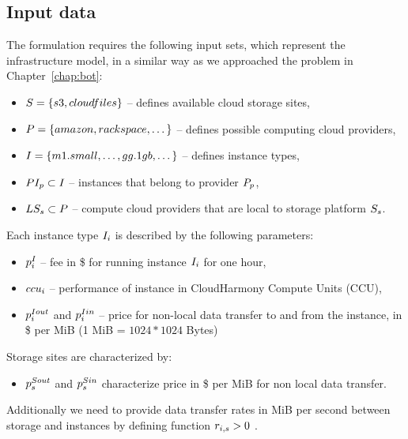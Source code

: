 {    \subsection{Input data}
    \label{sec:workflow:problem:input}
     
    The formulation requires the following input sets, which represent the infrastructure model, in a similar way as we approached the problem in Chapter~\ref{chap:bot}:
    \begin{itemize}
        \item $S = \{s3, cloudfiles\}$ -- defines available cloud storage
        sites,
        \item $P = \{amazon, rackspace, \dotsc\}$ -- defines
        possible computing cloud providers,
        \item $I = \{m1.small, \dots, gg.1gb, \dotsc\}$ -- defines
        instance types,
        \item $PI_{p} \subset I$ -- instances that
        belong to provider $P_p$,
        \item $LS_{s} \subset P$ -- compute cloud providers
        that are local to storage platform $S_s$.
    \end{itemize}        
        
    Each instance type $I_i$ is described by the following parameters:
    \begin{itemize}
        \item $p^I_i$ -- fee in \$ for running instance $I_i$
        for one hour,
        \item $ccu_i$ -- performance of instance in CloudHarmony Compute Units
        (CCU),
        \item $p^{Iout}_i$ and $p^{Iin}_i$ --
        price for non-local data transfer to and from the instance, in \$ per
        MiB (1 MiB = $1024*1024$ Bytes)
    \end{itemize}
    
    Storage sites are characterized by:
    \begin{itemize}
        \item $p^{Sout}_s$ and $p^{Sin}_s$
        characterize price in \$ per MiB for non local data transfer.
    \end{itemize}
    
    Additionally we need to provide data transfer rates in MiB per second between
    storage and instances by defining function $r_{i,s} > 0$ .
    
}
